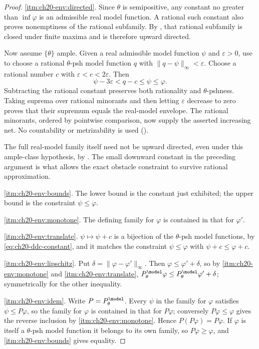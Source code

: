 \begin{proof}
\cref{itm:ch20-env:directed}.  Since $\theta$ is semipositive, any
constant no greater than $\inf\varphi$ is an admissible real model
function.  A rational such constant also proves nonemptiness of the
rational subfamily.  By , that rational subfamily
is closed under finite maxima and is therefore upward directed.

Now assume $\{\theta\}$ ample.  Given a real admissible model function
$\psi$ and $\varepsilon>0$, use
 to choose a rational
$\theta$-psh model function $q$ with
$\|q-\psi\|_\infty<\varepsilon$.  Choose a rational number $c$ with
$\varepsilon<c<2\varepsilon$.  Then
\[
             \psi-3\varepsilon<q-c\leq\psi\leq\varphi.
\]
Subtracting the rational constant preserves both rationality and
$\theta$-pshness.  Taking suprema over rational minorants and then
letting $\varepsilon$ decrease to zero proves that their supremum equals
the real-model envelope.  The rational minorants, ordered by pointwise
comparison, now supply the asserted increasing net.  No countability or
metrizability is used ().

The full real-model family itself need not be upward directed, even under
this ample-class hypothesis, by
.  The small downward constant
in the preceding argument is what allows the exact obstacle constraint to
survive rational approximation.

\cref{itm:ch20-env:bounds}.  The lower bound is the constant just exhibited;
the upper bound is the constraint $\psi\leq\varphi$.

\cref{itm:ch20-env:monotone}.  The defining family for $\varphi$ is
contained in that for $\varphi'$.

\cref{itm:ch20-env:translate}.  $\psi\mapsto\psi+c$ is a bijection of the
$\theta$-psh model functions, by \eqref{eq:ch20-ddc-constant}, and it
matches the constraint $\psi\leq\varphi$ with $\psi+c\leq\varphi+c$.

\cref{itm:ch20-env:lipschitz}.  Put $\delta=\|\varphi-\varphi'\|_\infty$.
Then $\varphi\leq\varphi'+\delta$, so by
\cref{itm:ch20-env:monotone} and \cref{itm:ch20-env:translate},
$P^{\model}_\theta\varphi\leq P^{\model}_\theta\varphi'+\delta$;
symmetrically for the other inequality.

\cref{itm:ch20-env:idem}.  Write $P=P^{\model}_\theta$.  Every $\psi$ in
the family for $\varphi$ satisfies $\psi\leq P\varphi$, so the family
for $\varphi$ is contained in that for $P\varphi$; conversely
$P\varphi\leq\varphi$ gives the reverse inclusion by
\cref{itm:ch20-env:monotone}.  Hence $P(P\varphi)=P\varphi$.  If
$\varphi$ is itself a $\theta$-psh model function it belongs to its own
family, so $P\varphi\geq\varphi$, and \cref{itm:ch20-env:bounds} gives
equality.


\end{proof}
